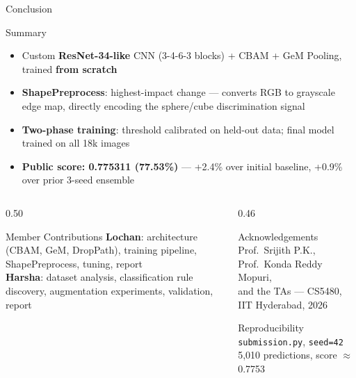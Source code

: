 \documentclass[aspectratio=169]{beamer}
\begin{document}
\begin{frame}[t,shrink=15]{Conclusion}
  \begin{block}{Summary}
    \footnotesize
    \begin{itemize}
      \item Custom \textbf{ResNet-34-like} CNN (3-4-6-3 blocks) + CBAM + GeM Pooling, trained \textbf{from scratch}
      \item \textbf{ShapePreprocess}: highest-impact change — converts RGB to grayscale edge map, directly encoding the sphere/cube discrimination signal
      \item \textbf{Two-phase training}: threshold calibrated on held-out data; final model trained on all 18k images
      \item \textbf{Public score: \alert{0.775311} (77.53\%)} — +2.4\% over initial baseline, +0.9\% over prior 3-seed ensemble
    \end{itemize}
  \end{block}
  \smallskip
  \begin{columns}[T]
    \begin{column}{0.50\textwidth}
      \begin{block}{Member Contributions}
        \footnotesize
        \textbf{Lochan}: architecture (CBAM, GeM, DropPath), training pipeline, ShapePreprocess, tuning, report\\[3pt]
        \textbf{Harsha}: dataset analysis, classification rule discovery, augmentation experiments, validation, report
      \end{block}
    \end{column}
    \begin{column}{0.46\textwidth}
      \begin{block}{Acknowledgements}
        \footnotesize Prof.\ Srijith P.K., Prof.\ Konda Reddy Mopuri,\\
        and the TAs — CS5480, IIT Hyderabad, 2026
      \end{block}
      \smallskip
      \begin{block}{Reproducibility}
        \footnotesize \texttt{submission.py}, \texttt{seed=42}\\
        5,010 predictions, score $\approx$ 0.7753
      \end{block}
    \end{column}
  \end{columns}
\end{frame}
\end{document}
